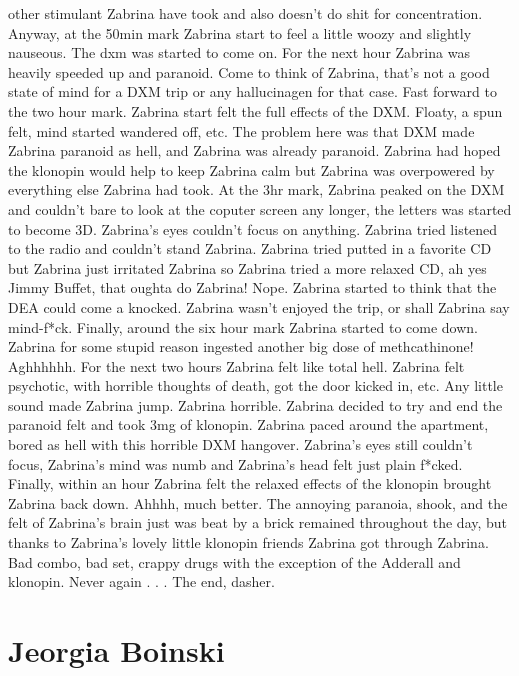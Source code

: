 \documentclass[12pt]{book}
\begin{document}
other stimulant Zabrina have took and also doesn't do shit for concentration. Anyway, at the 50min mark Zabrina start to feel a little woozy and slightly nauseous. The dxm was started to come on. For the next hour Zabrina was heavily speeded up and paranoid. Come to think of Zabrina, that's not a good state of mind for a DXM trip or any hallucinagen for that case. Fast forward to the two hour mark. Zabrina start felt the full effects of the DXM. Floaty, a spun felt, mind started wandered off, etc. The problem here was that DXM made Zabrina paranoid as hell, and Zabrina was already paranoid. Zabrina had hoped the klonopin would help to keep Zabrina calm but Zabrina was overpowered by everything else Zabrina had took. At the 3hr mark, Zabrina peaked on the DXM and couldn't bare to look at the coputer screen any longer, the letters was started to become 3D. Zabrina's eyes couldn't focus on anything. Zabrina tried listened to the radio and couldn't stand Zabrina. Zabrina tried putted in a favorite CD but Zabrina just irritated Zabrina so Zabrina tried a more relaxed CD, ah yes Jimmy Buffet, that oughta do Zabrina! Nope. Zabrina started to think that the DEA could come a knocked. Zabrina wasn't enjoyed the trip, or shall Zabrina say mind-f*ck. Finally, around the six hour mark Zabrina started to come down. Zabrina for some stupid reason ingested another big dose of methcathinone! Aghhhhhh. For the next two hours Zabrina felt like total hell. Zabrina felt psychotic, with horrible thoughts of death, got the door kicked in, etc. Any little sound made Zabrina jump. Zabrina horrible. Zabrina decided to try and end the paranoid felt and took 3mg of klonopin. Zabrina paced around the apartment, bored as hell with this horrible DXM hangover. Zabrina's eyes still couldn't focus, Zabrina's mind was numb and Zabrina's head felt just plain f*cked. Finally, within an hour Zabrina felt the relaxed effects of the klonopin brought Zabrina back down. Ahhhh, much better. The annoying paranoia, shook, and the felt of Zabrina's brain just was beat by a brick remained throughout the day, but thanks to Zabrina's lovely little klonopin friends Zabrina got through Zabrina. Bad combo, bad set, crappy drugs with the exception of the Adderall and klonopin. Never again . . .  The end, dasher.



\chapter{Jeorgia Boinski}
\end{document}
